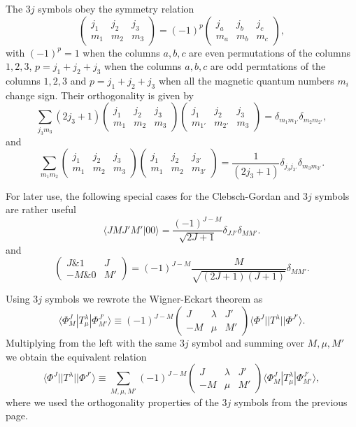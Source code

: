 \documentclass[graybox,sectrefs,envcountresetchap,open=right]{svmonodo}
\begin{document}
The $3j$ symbols obey the symmetry relation
\[
\left(\begin{array}{ccc}  j_1 & j_2 & j_3 \\ m_1 & m_2 & m_3\end{array}\right)=(-1)^{p}\left(\begin{array}{ccc}  j_a & j_b & j_c \\ m_a & m_b & m_c\end{array}\right),
\]
with $(-1)^p=1$ when the columns $a,b, c$ are even permutations of the columns $1,2,3$, $p=j_1+j_2+j_3$ when the columns $a,b,c$ are odd permtations of the
columns $1,2,3$ and $p=j_1+j_2+j_3$ when all the magnetic quantum numbers $m_i$ change sign. Their orthogonality is given by
\[
\sum_{j_3m_3}(2j_3+1)\left(\begin{array}{ccc}  j_1 & j_2 & j_3 \\ m_1 & m_2 & m_3\end{array}\right)\left(\begin{array}{ccc}  j_1 & j_2 & j_3 \\ m_{1'} & m_{2'} & m_3\end{array}\right)=\delta_{m_1m_{1'}}\delta_{m_2m_{2'}},
\]
and 
\[
\sum_{m_1m_2}\left(\begin{array}{ccc}  j_1 & j_2 & j_3 \\ m_1 & m_2 & m_3\end{array}\right)\left(\begin{array}{ccc}  j_1 & j_2 & j_{3'} \\ m_{1} & m_{2} & m_{3'}\end{array}\right)=\frac{1}{(2j_3+1)}\delta_{j_3j_{3'}}\delta_{m_3m_{3'}}.
\]

For later use, the following special cases for the Clebsch-Gordan and $3j$ symbols are rather useful
\[
\langle JM J'M' |00\rangle =\frac{(-1)^{J-M}}{\sqrt{2J+1}}\delta_{JJ'}\delta_{MM'}.
\] 
and 
\[
\left(\begin{array}{ccc}  J {\&} 1 & J \\ -M {\&} 0 & M'\end{array}\right)=(-1)^{J-M}\frac{M}{\sqrt{(2J+1)(J+1)}}\delta_{MM'}.
\]

Using $3j$ symbols we rewrote the Wigner-Eckart theorem as
\[
\langle \Phi^J_M|T^{\lambda}_{\mu}|\Phi^{J'}_{M'}\rangle\equiv(-1)^{J-M}\left(\begin{array}{ccc}  J & \lambda & J' \\ -M & \mu & M'\end{array}\right)\langle \Phi^J||T^{\lambda}||\Phi^{J'}\rangle.
\]
Multiplying from the left with the same $3j$ symbol and summing over $M,\mu,M'$ we obtain the equivalent relation 
\[
\langle \Phi^J||T^{\lambda}||\Phi^{J'}\rangle\equiv\sum_{M,\mu,M'}(-1)^{J-M}\left(\begin{array}{ccc}  J & \lambda & J' \\ -M & \mu & M'\end{array}\right)\langle \Phi^J_M|T^{\lambda}_{\mu}|\Phi^{J'}_{M'}\rangle,
\]
where we used the orthogonality properties of the $3j$ symbols from the previous page.
\end{document}
